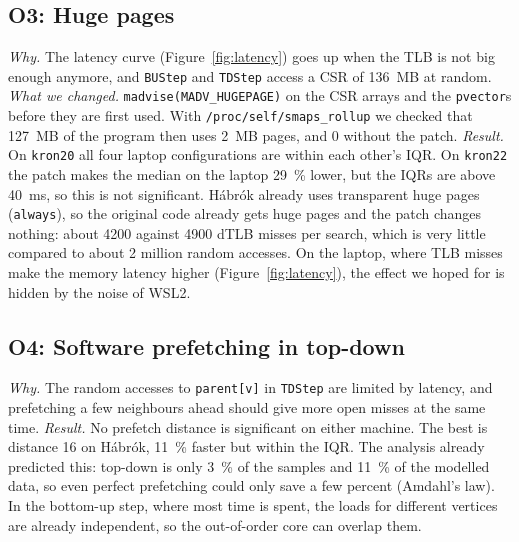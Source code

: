 \subsection{O3: Huge pages}
\emph{Why.} The latency curve (Figure~\ref{fig:latency}) goes up when the TLB is not big enough
anymore, and \texttt{BUStep} and \texttt{TDStep} access a CSR of \SI{136}{MB} at random.
\emph{What we changed.} \texttt{madvise(MADV\_HUGEPAGE)} on the CSR arrays and the
\texttt{pvector}s before they are first used. With \texttt{/proc/self/smaps\_rollup} we checked
that \SI{127}{MB} of the program then uses \SI{2}{MB} pages, and 0 without the patch.
\emph{Result.} On \texttt{kron20} all four laptop configurations are within each other's IQR.
On \texttt{kron22} the patch makes the median on the laptop \SI{29}{\percent} lower, but the IQRs
are above \SI{40}{ms}, so this is not significant. Hábrók already uses transparent huge pages
(\texttt{always}), so the original code already gets huge pages and the patch changes nothing:
about \num{4200} against \num{4900} dTLB misses per search, which is very little compared to
about 2 million random accesses. On the laptop, where TLB misses make the memory latency
higher (Figure~\ref{fig:latency}), the effect we hoped for is hidden by the noise of WSL2.

\subsection{O4: Software prefetching in top-down}
\emph{Why.} The random accesses to \texttt{parent[v]} in \texttt{TDStep} are limited by
latency, and prefetching a few neighbours ahead should give more open misses at the same
time. \emph{Result.} No prefetch distance is significant on either machine. The best is
distance 16 on Hábrók, \SI{11}{\percent} faster but within the IQR. The analysis already
predicted this: top-down is only \SI{3}{\percent} of the samples and \SI{11}{\percent} of the
modelled data, so even perfect prefetching could only save a few percent (Amdahl's law). In
the bottom-up step, where most time is spent, the loads for different vertices are already
independent, so the out-of-order core can overlap them.


